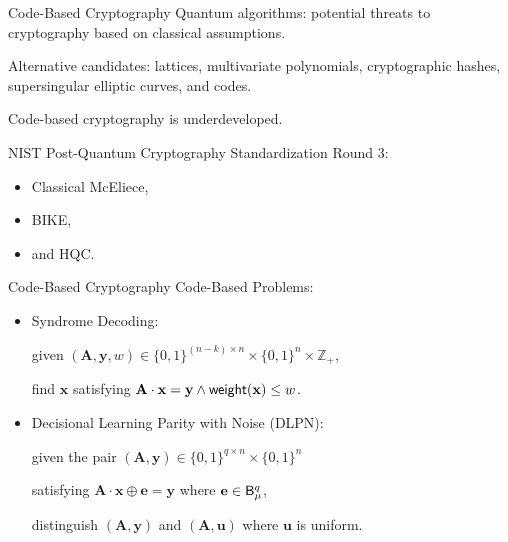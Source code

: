 \begin{frame}{Code-Based Cryptography}
	Quantum algorithms: potential threats to cryptography based on classical assumptions.\pause
	
	Alternative candidates: lattices, multivariate polynomials, cryptographic hashes, supersingular elliptic curves, and codes. \pause

	Code-based cryptography is underdeveloped.\pause
	
	NIST Post-Quantum Cryptography Standardization Round 3: \pause
	\begin{itemize}
		\item Classical McEliece, \pause
		\item BIKE,\pause
		\item and HQC.
	\end{itemize}
\end{frame}

\begin{frame}{Code-Based Cryptography}
	Code-Based Problems:\pause
	\begin{itemize}
		\item Syndrome Decoding: \pause
		
		given $(\mathbf{A}, \mathbf{y}, w) \in \{0,1\}^{(n - k)\times n}\times \{0,1\}^n\times \mathbb{Z}_+$,\pause
		
		find $\mathbf{x}$ satisfying $\mathbf{A}\cdot\mathbf{x} = \mathbf{y} \wedge \mathsf{weight}(\mathbf{x}) \leq w$.\pause
		
		\item Decisional Learning Parity with Noise (DLPN):\pause
		
		given the pair $(\mathbf{A}, \mathbf{y}) \in \{0,1\}^{q\times n}\times \{0,1\}^n$\pause
		
		satisfying $\mathbf{A}\cdot\mathbf{x}\oplus \mathbf{e} = \mathbf{y}$ where $\mathbf{e} \in \mathsf{B}_\mu^q$,\pause
		
		distinguish $(\mathbf{A}, \mathbf{y})$ and $(\mathbf{A}, \mathbf{u})$ where $\mathbf{u}$ is uniform.
	\end{itemize}
\end{frame}